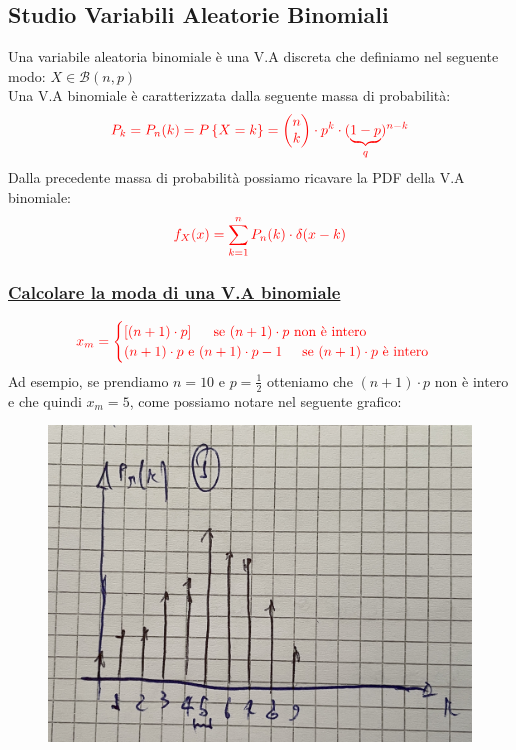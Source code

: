 \documentclass{article}
\begin{document}
\subsection{Studio Variabili Aleatorie Binomiali}
Una variabile aleatoria binomiale è una V.A discreta che definiamo nel seguente modo: $X \in \mathcal{B}(n,p)$ \\
Una V.A binomiale è caratterizzata dalla seguente massa di probabilità:
\[\color{red}P_k = P_n(k)= P \left\{X = k \right\} = \begin{pmatrix} n \\ k \end{pmatrix} \cdot p^k \cdot (\underset{q}{\underbrace{1-p}})^{n-k}\]
Dalla precedente massa di probabilità possiamo ricavare la PDF della V.A binomiale:
\[\color{red} f_X(x) = \sum_{k=1}^{n} P_n(k) \cdot \delta(x-k)\]
\subsubsection{\underline{Calcolare la moda di una V.A binomiale}}
\[\color{red}
x_m = \begin{cases}
\left[(n+1) \cdot p\right] \;\;\;\;\text{ se } (n+1)\cdot p \text{ non è intero} \\
(n+1) \cdot p \text{ e } (n+1)\cdot p -1 \;\;\;\;\text{ se } (n+1)\cdot p \text{ è intero}
\end{cases}\]
Ad esempio, se prendiamo $n = 10$ e $p = \frac 12$ otteniamo che $(n+1)\cdot p$ non è intero e che quindi $x_m = 5$, come possiamo notare nel seguente grafico:
\begin{figure}[H]
\centering
\includegraphics[scale=0.10]{images/64.ModaBinDeltaNonInt.jpeg}
\end{figure} ~\\
\end{document}
